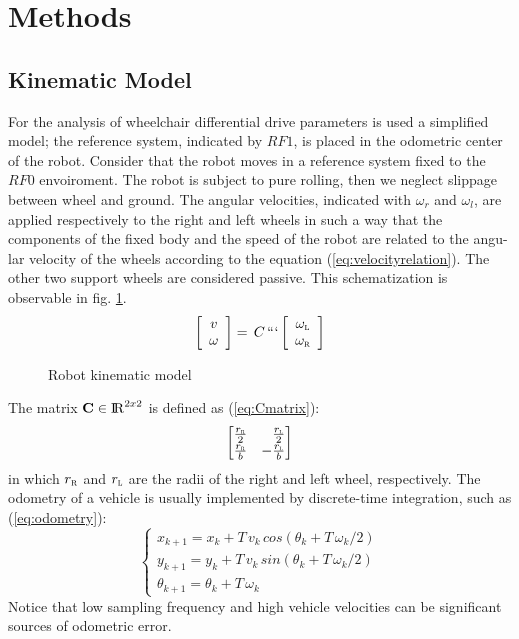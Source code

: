 \section{Methods}
\subsection{Kinematic Model}
For the analysis of wheelchair differential drive parameters is used a simplified model; the reference system, indicated by $RF1$, is placed in the odometric center of the robot. Consider that the robot moves in a reference system fixed to the $RF0$ envoiroment. The robot is subject to pure rolling, then we neglect slippage between wheel and ground. The angular velocities, indicated with $\omega_r$ and $\omega_l$, are applied respectively to the right and left wheels in such a way that the components of the fixed body and the speed of the robot are related to the angu- lar velocity of the wheels according to the equation (\ref{eq:velocityrelation}). The other two support wheels are considered passive. This schematization is observable in fig. \ref{fig:model}.
\begin{equation}
\label{eq:velocityrelation}
	\left[ \begin{array}{cc}
				v	\\									
				\omega 							
			 \end{array} 
	\right]  =\, C\,
```	\left[ \begin{array}{cc}
 				\omega_\textsc{l} \\ 
				\omega_\textsc{r}
			 \end{array} 
	\right]
\end{equation}

\begin{figure}[!h]
\centering
    \resizebox{.8\linewidth}{!}{}
\caption{Robot kinematic model}
\label{fig:model}
\end{figure}
\noindent The matrix $\textbf{C} \in \operatorname{\rm I\!R}^{2 x 2}$ is defined as (\ref{eq:Cmatrix}):
\begin{equation}
\label{eq:Cmatrix}
	\begin{bmatrix*}[r]
		\frac{r_\textsc{r}}{2} &	\frac{r_\textsc{l}}{2} \\
		\frac{r_\textsc{r}}{b} &	-\frac{r_\textsc{l}}{b} 
	\end{bmatrix*}
\end{equation}
in which $r_\textsc{r}$ and $r_\textsc{l}$ are the radii of the right and left wheel, respectively.
The odometry of a vehicle is usually implemented by discrete-time integration, such as (\ref{eq:odometry}):
\begin{equation}
\label{eq:odometry}
	\begin{cases}
		x_{k+1} = x_{k} + T \, v_{k} \, cos(\theta_{k} + T \,\omega_{k}/2)\\
		y_{k+1} = y_{k} + T \, v_{k} \, sin(\theta_{k} + T \, \omega_{k}/2)\\
		\theta_{k+1} = \theta_{k} + T \, \omega_{k}
	\end{cases}
\end{equation}
Notice that low sampling frequency and high vehicle velocities can be significant sources of odometric error.

